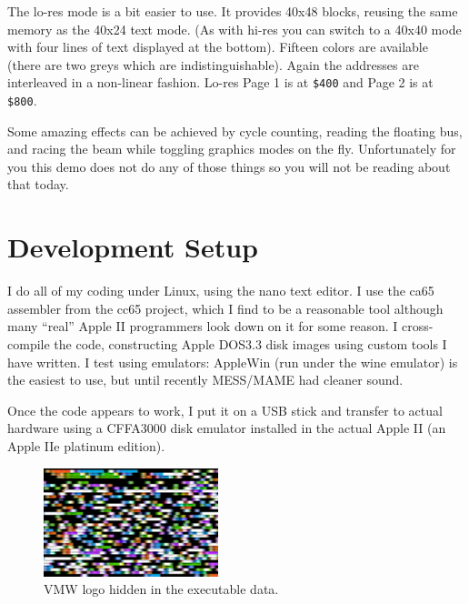 \documentclass[twocolumn]{article}
\begin{document}
The lo-res mode is a bit easier to use.  
It provides 40x48 blocks, reusing the same memory as the 40x24 text mode.
(As with hi-res you can switch to a 40x40 mode with four lines of
text displayed at the bottom).
Fifteen colors are available (there are two greys which are indistinguishable).
Again the addresses are interleaved in a non-linear fashion.
Lo-res Page 1 is at {\tt \$400} and Page 2 is at {\tt \$800}.

Some amazing effects can be achieved by cycle counting, reading
the floating bus, and racing the beam while toggling graphics
modes on the fly.
Unfortunately for you this demo does not do any of those things
so you will not be reading about that today.




\section{Development Setup}

I do all of my coding under Linux, using the nano text editor.
I use the ca65 assembler from the cc65 project, which I find to be a reasonable
tool although many ``real'' Apple II programmers look down on it for some
reason.
I cross-compile the code, constructing Apple DOS3.3 disk images using
custom tools I have written.
I test using emulators:
AppleWin (run under the wine emulator) is the easiest to use, but
until recently MESS/MAME had cleaner sound.

Once the code appears to work, I put it on a USB stick and transfer
to actual hardware using a CFFA3000 disk emulator installed in
the actual Apple II (an Apple IIe platinum edition).

%




\begin{figure}[tb]
\begin{center}
\includegraphics[width=2in]{figures/hidden_vmw.png}
\end{center}
\caption{VMW logo hidden in the executable data.\label{fig:vmw}}
\end{figure}
\end{document}
